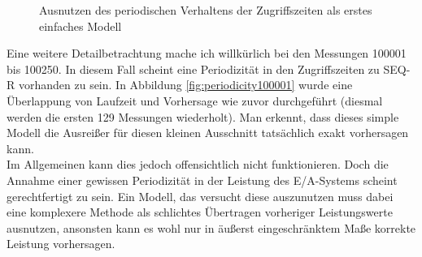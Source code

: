 \documentclass[
	12pt,
	a4paper,
	BCOR10mm,
	DIV14,
	listof=totoc,
	bibliography=totoc,
	headsepline
]{scrreprt}
\begin{document}
\begin{figure}
	\begin{center}
		\caption{Ausnutzen des periodischen Verhaltens der Zugriffszeiten als erstes einfaches Modell}
		\label{fig:periodicity}
	\end{center}
\end{figure} 
\medskip

Eine weitere Detailbetrachtung mache ich willkürlich bei den Messungen 100001 bis 100250.
In diesem Fall scheint eine Periodizität in den Zugriffszeiten zu SEQ-R vorhanden zu sein. In Abbildung \ref{fig:periodicity100001} wurde eine Überlappung von Laufzeit und Vorhersage wie zuvor durchgeführt (diesmal werden die ersten 129 Messungen wiederholt). Man erkennt, dass dieses simple Modell die Ausreißer für diesen kleinen Ausschnitt tatsächlich exakt vorhersagen kann.\\
Im Allgemeinen kann dies jedoch offensichtlich nicht funktionieren.
Doch die Annahme einer gewissen Periodizität in der Leistung des E/A-Systems scheint gerechtfertigt zu sein.
Ein Modell, das versucht diese auszunutzen muss dabei eine komplexere Methode als schlichtes Übertragen vorheriger Leistungswerte ausnutzen, ansonsten kann es wohl nur in äußerst eingeschränktem Maße korrekte Leistung vorhersagen.
\end{document}
